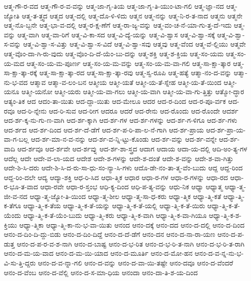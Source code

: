 {ಆತ್ಮ-ಗೌ-ರ-ವದ
ಆತ್ಮ-ಗೌ-ರ-ವ-ವನ್ನು
ಆತ್ಮ-ಜಾ-ಗೃ-ತಿಯ
ಆತ್ಮ-ಜಾ-ಗೃ-ತಿ-ಯುಂ-ಟಾ-ಗಲಿ
ಆತ್ಮ-ಜ್ಞಾ-ನದ
ಆತ್ಮ-ಜ್ಯೋತಿ
ಆತ್ಮ-ತ-ತ್ತ್ವದ
ಆತ್ಮದ
ಆತ್ಮ-ದಲ್ಲಿ
ಆತ್ಮ-ದೊ-ಳಿ-ಳಿದು
ಆತ್ಮನ
ಆತ್ಮ-ನನ್ನು
ಆತ್ಮ-ನಿ-ರ-ತ-ನಾದ
ಆತ್ಮನು
ಆತ್ಮನೇ
ಆತ್ಮ-ನೊ-ಬ್ಬನೇ
ಆತ್ಮ-ಭಾ-ವ-ದಲ್ಲಿ
ಆತ್ಮ-ರ-ಕ್ಷ-ಣೆಗೆ
ಆತ್ಮ-ರಾ-ಜ್ಯ-ವನ್ನು
ಆತ್ಮ-ವಂ-ಚ-ನೆ-ಯಾ-ಗು-ತ್ತ-ದೆ-ಇದು
ಆತ್ಮ-ವನ್ನು
ಆತ್ಮ-ವಾಗಿ
ಆತ್ಮ-ವಾ-ರಿಗೆ
ಆತ್ಮ-ವಿ-ಕಾ-ಸದ
ಆತ್ಮ-ವಿ-ದ್ಯೆ-ಯನ್ನು
ಆತ್ಮ-ವಿ-ಶ್ವಾಸ
ಆತ್ಮ-ವಿ-ಶ್ವಾ-ಸಕ್ಕೆ
ಆತ್ಮ-ವಿ-ಶ್ವಾ-ಸ-ವನ್ನು
ಆತ್ಮ-ವಿ-ಶ್ವಾ-ಸ-ವಿತ್ತು
ಆತ್ಮ-ವಿ-ಶ್ವಾ-ಸ-ವಿದೆ
ಆತ್ಮ-ವಿ-ಶ್ವಾ-ಸವು
ಆತ್ಮವು
ಆತ್ಮ-ವೆಂದ
ಆತ್ಮ-ವೆ-ಲ್ಲಿಯು
ಆತ್ಮವೇ
ಆತ್ಮ-ವೊಂ-ದಾ-ಗಿ-ರು-ವುದು
ಆತ್ಮ-ವೊಂ-ದಿ-ದೆ-ಯೆಂ-ಬು-ದನ್ನು
ಆತ್ಮ-ಶಕ್ತಿ
ಆತ್ಮ-ಶ-ಕ್ತಿಯ
ಆತ್ಮ-ಸಂ-ಯಮ
ಆತ್ಮ-ಸಂ-ಯ-ಮದ
ಆತ್ಮ-ಸಂ-ಯ-ಮ-ಪೂರ್ಣ
ಆತ್ಮ-ಸಂ-ಯ-ಮ-ವನ್ನು
ಆತ್ಮ-ಸಂ-ಯ-ಮ-ವಾ-ಗಲಿ
ಆತ್ಮ-ಸಾ-ಕ್ಷಾ-ತ್ಕಾರ
ಆತ್ಮ-ಸಾ-ಕ್ಷಾ-ತ್ಕಾ-ರಕ್ಕೆ
ಆತ್ಮ-ಸಾ-ಕ್ಷಾ-ತ್ಕಾ-ರದ
ಆತ್ಮ-ಸಾ-ಕ್ಷಾ-ತ್ಕಾ-ರವು
ಆತ್ಮ-ಸ್ವ-ರೂಪಿ
ಆತ್ಮ-ಹತ್ಯೆ
ಆತ್ಮಾ-ನಂ-ದ-ವನ್ನು
ಆತ್ಮಾ-ನು-ಭ-ವದ
ಆತ್ಮಾವ
ಆತ್ಮಾ-ವ-ಲಂ-ಬನ
ಆತ್ಮೀಯ
ಆತ್ಮೀ-ಯತೆ
ಆತ್ಮೀ-ಯ-ತೆ-ಸ್ನೇಹ
ಆತ್ಮೀ-ಯ-ತೆ-ಯಿಂದ
ಆತ್ಮೀ-ಯನೂ
ಆತ್ಮೀ-ಯನೋ
ಆತ್ಮೀ-ಯರು
ಆತ್ಮೀ-ಯ-ವಾ-ಗಲು
ಆತ್ಮೀ-ಯ-ವಾಗಿ
ಆತ್ಮೀ-ಯ-ವಾ-ಗು-ತ್ತಿತ್ತು
ಆತ್ಮೋ-ದ್ಧಾರ
ಆತ್ಯಂ-ತಿಕ
ಆದ
ಆದಂ-ತಾ-ಯಿತು
ಆದ-ದ್ದಾ-ಯಿತು
ಆದ-ಮೇಲೂ
ಆದರ
ಆದ-ರ-ದಿಂದ
ಆದ-ರ-ಪೂ-ರ್ವಕ
ಆದ-ರವೂ
ಆದ-ರಿ-ನ್ನೇನು
ಆದ-ರಿ-ಸುವ
ಆದ-ರೀಗ
ಆದರೂ
ಆದರೆ
ಆದ-ರೇನು
ಆದ-ರೊಂದು
ಆದ-ರೊಂದೇ
ಆದರ್ಶ
ಆದ-ರ್ಶ-ಕ್ಕ-ನು-ಗು-ಣ-ವಾಗಿ
ಆದ-ರ್ಶ-ಕ್ಕಾಗಿ
ಆದ-ರ್ಶ-ಗಳ
ಆದ-ರ್ಶ-ಗಳನ್ನು
ಆದ-ರ್ಶ-ಗ-ಳಿಗೂ
ಆದ-ರ್ಶ-ಗಳು
ಆದ-ರ್ಶದ
ಆದ-ರ್ಶ-ದಿಂದ
ಆದ-ರ್ಶ-ದೆ-ಡೆಗೆ
ಆದ-ರ್ಶ-ಪ-ರಿ-ಪಾ-ಲ-ನೆ-ಗಾಗಿ
ಆದ-ರ್ಶ-ಪ್ರಾಯ
ಆದ-ರ್ಶ-ಪ್ರಾ-ಯ-ವಾ-ಗ-ಬಲ್ಲ
ಆದ-ರ್ಶ-ಮಾ-ನ-ವ-ನನ್ನು
ಆದ-ರ್ಶ-ವ-ನ್ನಿ-ಟ್ಟು-ಕೊಂಡು
ಆದ-ರ್ಶ-ವನ್ನು
ಆದ-ರ್ಶ-ವನ್ನೇ
ಆದ-ರ್ಶ-ವಾದಿ
ಆದ-ರ್ಶವೂ
ಆದ-ರ್ಶವೇ
ಆದ-ರ್ಶವ್ನು
ಆದ-ರ್ಶ-ಶಾ-ಸ್ತ್ರದ
ಆದಾಗ
ಆದಾಯ
ಆದಾ-ಯ-ದಲ್ಲಿ
ಆದಿ-ಅಂ-ತ್ಯ-ಗಳ
ಆದೆಲ್ಲ
ಆದೇ
ಆದೇ-ವ-ಲಾ-ಯದ
ಆದೇಶ
ಆದೇ-ಶ-ಗಳನ್ನು
ಆದೇ-ಶ-ದಂತೆ
ಆದೇ-ಶ-ವನ್ನು
ಆದೇ-ಶ-ವಾ-ಗಿತ್ತು
ಆದೇ-ಶಿ-ಸಿ-ದರು
ಆದೇ-ಶಿ-ಸಿ-ದ-ರು-ಸಾ-ಧು-ಸಂ-ನ್ಯಾ-ಸಿ-ಗಳು
ಆದೊ-ಡೇ-ನಂ-ತಾ-ತ್ಮ-ವೆಂ-ಬುದು
ಆದ್ದ
ಆದ್ದ-ರಿಂದ
ಆದ್ದ-ರಿಂ-ದಲೇ
ಆದ್ಯ
ಆದ್ಯಾ-ಶಕ್ತಿ
ಆಧ-ರಿ-ಸಿದ
ಆಧಾ-ತ್ಮಿಕ
ಆಧಾರ
ಆಧಾ-ರ-ಗಳ
ಆಧಾ-ರ-ಗಳನ್ನು
ಆಧಾ-ರದ
ಆಧಾ-ರ-ಭೂ-ತ-ವಾದ
ಆಧಾ-ರವೇ
ಆಧಾ-ರ-ಸ್ತಂಭ
ಆಧಿ-ಕ್ಯ-ದಿಂದ
ಆಧಿ-ಪ-ತ್ಯ-ವನ್ನು
ಆಧು-ನಿಕ
ಆಧ್ಯಾ
ಆಧ್ಯಾತ್ಮ
ಆಧ್ಯಾ-ತ್ಮ-ಜೀ-ವ-ನದ
ಆಧ್ಯಾ-ತ್ಮ-ಜ್ಯೋ-ತಿ-ಯಿಂದ
ಆಧ್ಯಾ-ತ್ಮ-ಶೀಲ
ಆಧ್ಯಾ-ತ್ಮ-ಸಾ-ಧ-ಕರು
ಆಧ್ಯಾ-ತ್ಮಿಕ
ಆಧ್ಯಾ-ತ್ಮಿ-ಕತೆ
ಆಧ್ಯಾ-ತ್ಮಿ-ಕ-ತೆಗೂ
ಆಧ್ಯಾ-ತ್ಮಿ-ಕ-ತೆಯ
ಆಧ್ಯಾ-ತ್ಮಿ-ಕ-ತೆ-ಯನ್ನು
ಆಧ್ಯಾ-ತ್ಮಿ-ಕ-ತೆ-ಯಲ್ಲಿ
ಆಧ್ಯಾ-ತ್ಮಿ-ಕ-ತೆ-ಯಿರು
ಆಧ್ಯಾ-ತ್ಮಿ-ಕ-ತೆ-ಯೆಂದು
ಆಧ್ಯಾ-ತ್ಮಿ-ಕ-ತೆ-ಯೆಂ-ಬುದು
ಆಧ್ಯಾ-ತ್ಮಿ-ಕರು
ಆಧ್ಯಾ-ತ್ಮಿ-ಕ-ವಾಗಿ
ಆಧ್ಯಾ-ತ್ಮಿ-ಕ-ವಾ-ಗಿಯೂ
ಆಧ್ಯಾ-ತ್ಮಿ-ಕ-ಶ-ಕ್ತಿಯು
ಆಧ್ಯಾ-ತ್ಮಿಕಾ
ಆಧ್ಯಾ-ತ್ಮಿ-ಕಾ-ನು-ಭ-ವಾ-ಯಿತು
ಆನಂದ
ಆನಂ-ದಕ್ಕೆ
ಆನಂ-ದದ
ಆನಂ-ದ-ದಲ್ಲಿ
ಆನಂ-ದ-ದಿಂದ
ಆನಂ-ದ-ದಿಂ-ದಿ-ದ್ದು-ಬಿಡು
ಆನಂ-ದ-ದಿಂ-ದಿದ್ದೆ
ಆನಂ-ದ-ದೆ-ಡೆಗೆ
ಆನಂ-ದನ
ಆನಂ-ದ-ನಾ-ರಾ-ಯಣ
ಆನಂ-ದ-ಪ-ಡುತ್ತ
ಆನಂ-ದ-ಪ-ರ-ವ-ಶ-ನಾಗಿ
ಆನಂ-ದ-ಬಾಷ್ಟ
ಆನಂ-ದ-ಭ-ರಿತ
ಆನಂ-ದ-ಭ-ರಿ-ತ-ನಾಗಿ
ಆನಂ-ದ-ಭ-ರಿ-ತ-ರಾಗಿ
ಆನಂ-ದ-ಮ-ಯ-ವಾದ
ಆನಂ-ದ-ಮ-ಯಿ-ಯಾದ
ಆನಂ-ದ-ಮೂರ್ತಿ
ಆನಂ-ದ-ಮೋ-ಹನ
ಆನಂ-ದ-ವ-ನ್ನ-ನು-ಭ-ವಿ-ಸು-ತ್ತಿ-ದ್ದರು
ಆನಂ-ದ-ವ-ನ್ನಾ-ಗಲಿ
ಆನಂ-ದ-ವನ್ನು
ಆನಂ-ದ-ವಾ-ಯಿ-ತಷ್ಟೇ
ಆನಂ-ದವೂ
ಆನಂ-ದ-ವೆಂದರೆ
ಆನಂ-ದ-ವೆಂಬ
ಆನಂ-ದ-ವೆಲ್ಲಿ
ಆನಂ-ದ-ಸ-ಮಾ-ಧಿಯ
ಆನಂದಾ
ಆನಂ-ದಾ-ತಿ-ಶ-ಯ-ದಿಂದ
}
